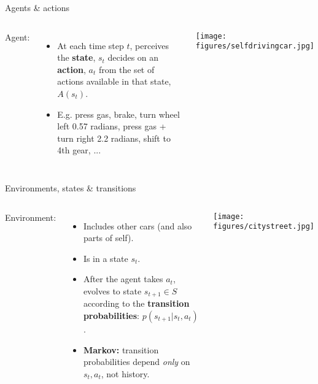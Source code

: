 \documentclass[handout]{beamer} %
\begin{document}
\begin{frame}{Agents \& actions}
\begin{columns}
Agent:
\begin{itemize}
    \item At each time step \(t\), perceives the \textbf{state}, \(s_t\) decides on an \textbf{action}, \(a_t\) from the set of actions available in that state, \(A(s_t)\).
    \item<2-> E.g. press gas, brake, turn wheel left 0.57 radians, press gas + turn right 2.2 radians, shift to 4th gear, ...
\end{itemize}
    \begin{center}
    \texttt{[image: figures/selfdrivingcar.jpg]}
    \end{center}
\end{columns}
\end{frame}

\begin{frame}{Environments, states \& transitions}
\begin{columns}
Environment:
\begin{itemize}
    \item Includes other cars (and also parts of self).
    \item<2-> Is in a state \(s_t\). 
    \item<3-> After the agent takes \(a_t\), evolves to state \(s_{t+1} \in S\) according to the \textbf{transition probabilities}: \(p(s_{t+1} | s_t, a_t)\).
    \item<4-> \textbf{Markov:} transition probabilities depend \emph{only} on \(s_t, a_t\), not history. 
\end{itemize}
    \begin{center}
    \texttt{[image: figures/citystreet.jpg]}
    \end{center}
\end{columns}
\end{frame}
\end{document}
